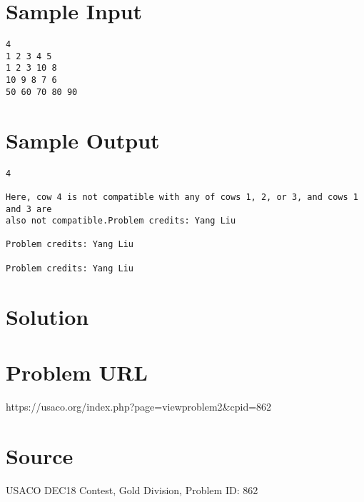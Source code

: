 \documentclass[12pt]{article}
\begin{document}
\section*{Sample Input}
\begin{verbatim}
4
1 2 3 4 5
1 2 3 10 8
10 9 8 7 6
50 60 70 80 90
\end{verbatim}

\section*{Sample Output}
\begin{verbatim}
4

Here, cow 4 is not compatible with any of cows 1, 2, or 3, and cows 1 and 3 are
also not compatible.Problem credits: Yang Liu

Problem credits: Yang Liu

Problem credits: Yang Liu
\end{verbatim}

\section*{Solution}


\section*{Problem URL}
https://usaco.org/index.php?page=viewproblem2&cpid=862

\section*{Source}
USACO DEC18 Contest, Gold Division, Problem ID: 862
\end{document}
